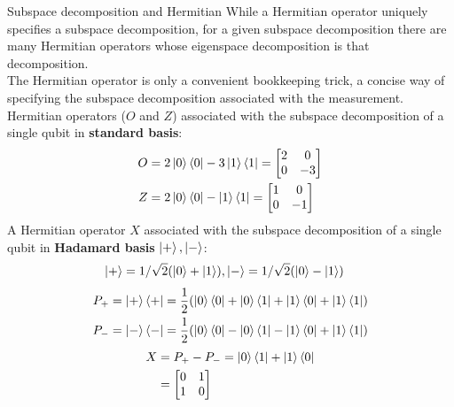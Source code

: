 \documentclass{beamer}
\begin{document}
\begin{frame}{Subspace decomposition and Hermitian}
  {\tiny
    While a Hermitian operator uniquely specifies a subspace decomposition,
    for a given subspace decomposition there are many Hermitian operators whose eigenspace decomposition is that decomposition.\\
    The Hermitian operator is only a convenient bookkeeping trick, a concise way of specifying the subspace decomposition associated with the measurement.\\
    Hermitian operators ($O$ and $Z$) associated with the subspace decomposition of a single qubit in \textbf{standard basis}:
    \begin{align*}
      O &= 2 \ket0 \bra0 - 3 \ket1 \bra1
        = \begin{bmatrix}
             2 & 0 \\
             0 & -3
           \end{bmatrix} \\
      Z &= 2 \ket0 \bra0 - \ket1 \bra1
        = \begin{bmatrix}
             1 & 0 \\
             0 & -1
           \end{bmatrix}
    \end{align*}
    A Hermitian operator $X$ associated with the subspace decomposition of a single qubit in \textbf{Hadamard basis} {$\ket+, \ket-$}:
    \begin{align*}
      \ket+ = 1/\sqrt2 ( \ket0 + \ket1), & \ket- = 1/\sqrt2 ( \ket0 - \ket1)
    \end{align*}
    \begin{align*}
      P_+ &= \ket+ \bra+ = \frac{1}{2} ( \ket0\bra0 + \ket0\bra1 + \ket1\bra0 + \ket1\bra1 ) \\
      P_- &= \ket- \bra- = \frac{1}{2} ( \ket0\bra0 - \ket0\bra1 - \ket1\bra0 + \ket1\bra1 ) \\
    \end{align*}
    \begin{align*}
      X &= P_+ - P_- = \ket0\bra1 + \ket1\bra0 \\
      &= \begin{bmatrix}
        0 & 1 \\
        1 & 0
      \end{bmatrix}
    \end{align*}
  }%
\end{frame}
\end{document}
